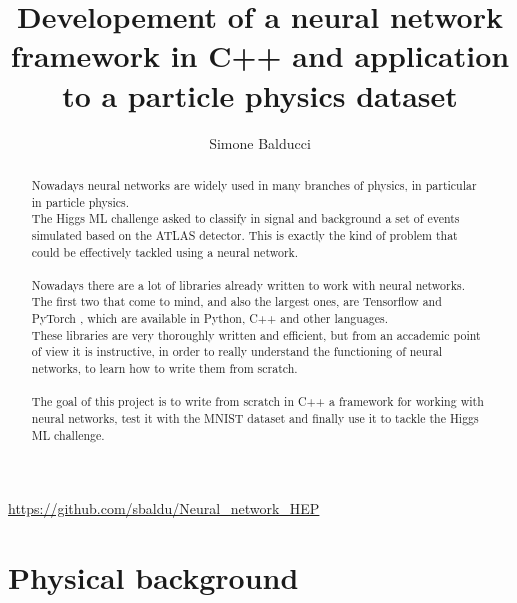 \documentclass[12pt]{article}
\title{Developement of a neural network framework in C++ and application to a particle 
physics dataset}
\author{Simone Balducci}
\date{}
\begin{document}
\maketitle
\begin{center}
	\url{https://github.com/sbaldu/Neural_network_HEP}
\end{center}

\begin{abstract}
  \noindent Nowadays neural networks are widely used in many branches of physics, in par\-ti\-cu\-lar 
  in particle physics. \\
  The Higgs ML challenge \cite{HiggsML} asked to classify in signal and background a set of events simulated based on the 
  ATLAS detector. This is exactly the kind of problem that could be effectively tackled using a neural 
  network. \\ \\
  Nowadays there are a lot of libraries already written to work with neural networks. The first two that
  come to mind, and also the largest ones, are Tensorflow \cite{TensorFlow} and PyTorch \cite{Pytorch}, which are available in Python, C++ 
  and other languages. \\
  These libraries are very thoroughly written and efficient, but from an accademic point of view it is
  instructive, in order to really understand the functioning of neural networks, to learn how to write 
  them from scratch. \\ \\
  The goal of this project is to write from scratch in C++ a framework for wor\-king with neu\-ral networks, 
  test it with the MNIST \cite{MNIST} dataset and finally use it to tackle the Higgs ML challenge.
\end{abstract}
\pagebreak

\tableofcontents
\vspace{1cm}
\lstlistoflistings
\pagebreak

\section{Physical background}
\end{document}
